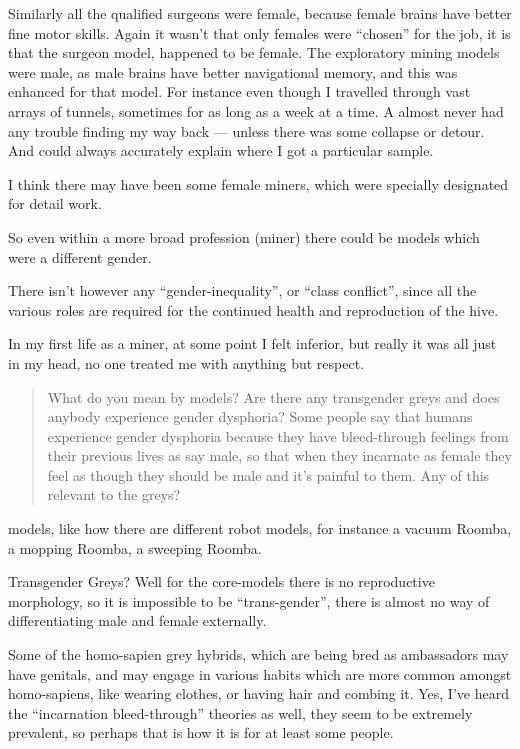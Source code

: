 Similarly all the qualified surgeons were female, because female brains have
better fine motor skills. Again it wasn't that only females were ``chosen'' for
the job, it is that the surgeon model, happened to be female. The exploratory
mining models were male, as male brains have better navigational memory, and
this was enhanced for that model. For instance even though I travelled through
vast arrays of tunnels, sometimes for as long as a week at a time. A almost
never had any trouble finding my way back --- unless there was some collapse or
detour. And could always accurately explain where I got a particular sample.

I think there may have been some female miners, which were specially designated
for detail work.

So even within a more broad profession (miner) there could be models which were
a different gender.

There isn't however any ``gender-inequality'', or ``class conflict'', since all the
various roles are required for the continued health and reproduction of the
hive.

In my first life as a miner, at some point I felt inferior, but really it was
all just in my head, no one treated me with anything but respect.

\blockquote{What do you mean by models? Are there any transgender greys and does
anybody experience gender dysphoria? Some people say that humans experience
gender dysphoria because they have bleed-through feelings from their previous
lives as say male, so that when they incarnate as female they feel as though
they should be male and it's painful to them. Any of this relevant to the
greys?}

models, like how there are different robot models, for instance a vacuum Roomba,
a mopping Roomba, a sweeping Roomba.

Transgender Greys? Well for the core-models there is no reproductive morphology,
so it is impossible to be ``trans-gender'', there is almost no way of
differentiating male and female externally.

Some of the homo-sapien grey hybrids, which are being bred as ambassadors may
have genitals, and may engage in various habits which are more common amongst
homo-sapiens, like wearing clothes, or having hair and combing it. Yes, I've
heard the ``incarnation bleed-through'' theories as well, they seem to be
extremely prevalent, so perhaps that is how it is for at least some people.

